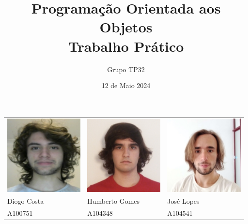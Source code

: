 \documentclass[12pt, a4paper]{article}
\title{\textbf{Programação Orientada aos Objetos \\ \large Trabalho Prático}}
\date{12 de Maio 2024}
\author{Grupo TP32}
\begin{document}
\onehalfspacing
\setlength{\parskip}{\baselineskip}
\setlength{\parindent}{0pt}
\def\arraystretch{1.5}

\maketitle

\vspace{8cm}
\begin{center}
    \begin{tabular}{>{\centering}p{}
                    >{\centering}p{}
                    >{\centering\arraybackslash}p{}}
        \includegraphics[width=4cm]{Diogo.jpeg}    &
        \includegraphics[width=4cm]{Humberto.jpeg} &
        \includegraphics[width=4cm]{Jose.jpeg}     \\

        Diogo Costa & Humberto Gomes & José Lopes  \\
        A100751     & A104348        & A104541
    \end{tabular}
\end{center}
\pagebreak
\end{document}
